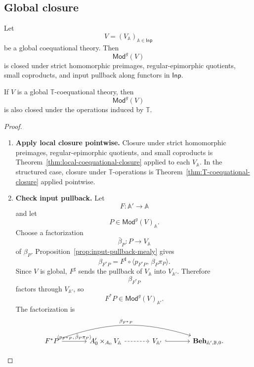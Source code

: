 \subsection{Global closure}
\label{subsec:global-coequational-closure}

\begin{theorem}
\label{thm:global-coequational-closure}
    Let
    \[
        V=(V_{\mathbb A})_{\mathbb A\in\mathsf{Inp}}
    \]
    be a global coequational theory. Then
    \[
        \mathsf{Mod}^{g}(V)
    \]
    is closed under strict homomorphic preimages, regular-epimorphic quotients,
    small coproducts, and input pullback along functors in \(\mathsf{Inp}\).

    If \(V\) is a global \(\mathbb T\)-coequational theory, then
    \[
        \mathsf{Mod}^{g}(V)
    \]
    is also closed under the operations induced by \(\mathbb T\).
\end{theorem}

\begin{proof}
    \leavevmode
    \begin{enumerate}
        \item \textbf{Apply local closure pointwise.}
        Closure under strict homomorphic preimages, regular-epimorphic
        quotients, and small coproducts is
        Theorem~\ref{thm:local-coequational-closure} applied to each
        \(V_{\mathbb A}\). In the structured case, closure under
        \(\mathbb T\)-operations is Theorem~\ref{thm:T-coequational-closure}
        applied pointwise.

        \item \textbf{Check input pullback.}
        Let
        \[
            F:\mathbb A'\to\mathbb A
        \]
        and let
        \[
            P\in\mathsf{Mod}^{g}(V)_{\mathbb A}.
        \]
        Choose a factorization
        \[
            \bar\beta_P:P\to V_{\mathbb A}
        \]
        of \(\beta_P\). Proposition~\ref{prop:input-pullback-mealy}
        gives
        \[
            \beta_{F^*P}
            =
            F^\sharp
            \circ
            \langle p_{F^*P},\,\beta_P\pi_P\rangle.
        \]
        Since \(V\) is global, \(F^\sharp\) sends the pullback of
        \(V_{\mathbb A}\) into \(V_{\mathbb A'}\). Therefore
        \[
            \beta_{F^*P}
        \]
        factors through \(V_{\mathbb A'}\), so
        \[
            F^*P\in\mathsf{Mod}^{g}(V)_{\mathbb A'}.
        \]
        The factorization is
        \[
        \begin{tikzcd}[column sep=large, row sep=large]
            F^*P
                \arrow[r, "{\langle p_{F^*P},\,\bar\beta_P\pi_P\rangle}"]
                \arrow[rrr, bend left=18, "\beta_{F^*P}"]
            &
            A'_0\times_{A_0}V_{\mathbb A}
                \arrow[r, dashed]
            &
            V_{\mathbb A'}
                \arrow[r, hook]
            &
            \mathbf{Beh}_{\mathbb A',\mathbb B,0}.
        \end{tikzcd}
        \]
    \end{enumerate}
\end{proof}

